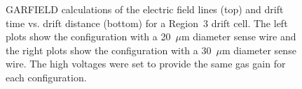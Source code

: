 \begin{figure}[htbp]
\vspace{12.0cm}
\caption{\small{GARFIELD calculations of the electric field lines (top)
and drift time vs. drift distance (bottom) for a Region~3 drift cell.  The 
left plots show the configuration with a 20~$\mu$m diameter sense wire and 
the right plots show the configuration with a 30~$\mu$m diameter sense wire.
The high voltages were set to provide the same gas gain for each
configuration.}}
\label{garfield}
\end{figure}




